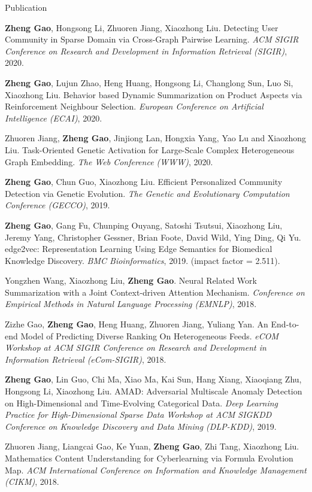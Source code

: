 \begin{spacing}{1.0}
\begin{cv}{}
	\begin{cvlist}{Publication}
		\item \textbf{Zheng Gao}, Hongsong Li, Zhuoren Jiang, Xiaozhong Liu. Detecting User Community in Sparse Domain via Cross-Graph Pairwise Learning. \textit{ACM SIGIR Conference on Research and Development in Information Retrieval (SIGIR)}, 2020.
		 \item \textbf{Zheng Gao}, Lujun Zhao, Heng Huang, Hongsong Li, Changlong Sun, Luo Si, Xiaozhong Liu. Behavior based Dynamic Summarization on Product Aspects via Reinforcement Neighbour Selection. \textit{European Conference on Artificial Intelligence (ECAI)}, 2020.
		\item Zhuoren Jiang, \textbf{Zheng Gao}, Jinjiong Lan, Hongxia Yang, Yao Lu and Xiaozhong Liu. Task-Oriented Genetic Activation for Large-Scale Complex Heterogeneous Graph Embedding. \textit{The Web Conference (WWW)}, 2020.
		\item \textbf{Zheng Gao}, Chun Guo, Xiaozhong Liu. Efficient Personalized Community Detection via Genetic Evolution. \textit{The Genetic and Evolutionary Computation Conference (GECCO)}, 2019.
		\item \textbf{Zheng Gao}, Gang Fu, Chunping Ouyang, Satoshi Tsutsui, Xiaozhong Liu, Jeremy Yang, Christopher Gessner, Brian Foote, David Wild, Ying Ding, Qi Yu. edge2vec: Representation Learning Using Edge Semantics for Biomedical Knowledge Discovery. \textit{BMC Bioinformatics}, 2019. (impact factor = 2.511).
		\item Yongzhen Wang, Xiaozhong Liu, \textbf{Zheng Gao}. Neural Related Work Summarization with a Joint Context-driven Attention Mechanism. \textit{Conference on Empirical Methods in Natural Language Processing (EMNLP)}, 2018.
		\item Zizhe Gao, \textbf{Zheng Gao}, Heng Huang, Zhuoren Jiang, Yuliang Yan. An End-to-end Model of Predicting Diverse Ranking On Heterogeneous Feeds. \textit{eCOM Workshop at ACM SIGIR Conference on Research and Development in Information Retrieval (eCom-SIGIR)}, 2018.
		\item \textbf{Zheng Gao}, Lin Guo, Chi Ma, Xiao Ma, Kai Sun, Hang Xiang, Xiaoqiang Zhu, Hongsong Li, Xiaozhong Liu. AMAD: Adversarial Multiscale Anomaly Detection on High-Dimensional and Time-Evolving Categorical Data. \textit{Deep Learning Practice for High-Dimensional Sparse Data Workshop at ACM SIGKDD Conference on Knowledge Discovery and Data Mining (DLP-KDD)}, 2019.
		\item Zhuoren Jiang, Liangcai Gao, Ke Yuan, \textbf{Zheng Gao}, Zhi Tang, Xiaozhong Liu. Mathematics Content Understanding for Cyberlearning via Formula Evolution Map. \textit{ACM International Conference on Information and Knowledge Management (CIKM)}, 2018.

\end{cvlist}
\end{cv}
\end{spacing}
